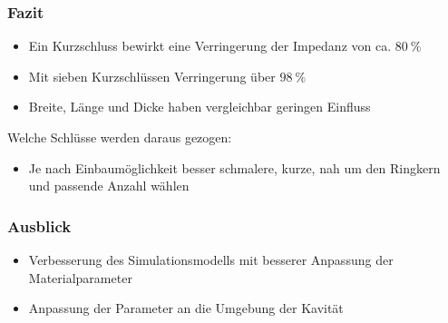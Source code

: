 \documentclass[accentcolor=tud9b, colorbacktitle, inverttitle]{tudbeamer}
\begin{document}
\begin{frame}\frametitle{Fazit}
\begin{itemize}
	\item Ein Kurzschluss bewirkt eine Verringerung der Impedanz von ca. $\SI{80}{\%}$
	\item Mit sieben Kurzschl\"ussen Verringerung \"uber $\SI{98}{\%}$
	\item Breite, Länge und Dicke haben vergleichbar geringen Einfluss
\end{itemize}
Welche Schlüsse werden daraus gezogen:
\begin{itemize}
	\item Je nach Einbaumöglichkeit besser schmalere, kurze, nah um den Ringkern und passende Anzahl wählen
\end{itemize}
\end{frame}

\begin{frame}\frametitle{Ausblick}
\begin{itemize}
	\item Verbesserung des Simulationsmodells mit besserer Anpassung der Materialparameter
	\item Anpassung der Parameter an die Umgebung der Kavität
\end{itemize}
\end{frame}


% 	 
\end{document}
